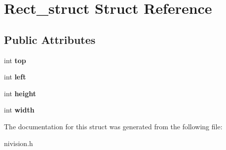 \hypertarget{structRect__struct}{
\section{Rect\_\-struct Struct Reference}
\label{structRect__struct}
}
\subsection*{Public Attributes}
\begin{DoxyCompactItemize}
\item 
\hypertarget{structRect__struct_a87ebf8a6280b23db750fd6d4e358d62b}{
int {\bfseries top}}
\label{structRect__struct_a87ebf8a6280b23db750fd6d4e358d62b}

\item 
\hypertarget{structRect__struct_a261b0001e6bd3dd2118e561e2dc1b838}{
int {\bfseries left}}
\label{structRect__struct_a261b0001e6bd3dd2118e561e2dc1b838}

\item 
\hypertarget{structRect__struct_a4033be30e4966e318c9bd115538c6163}{
int {\bfseries height}}
\label{structRect__struct_a4033be30e4966e318c9bd115538c6163}

\item 
\hypertarget{structRect__struct_ab21213efdd7b95b183b2859fe7dff978}{
int {\bfseries width}}
\label{structRect__struct_ab21213efdd7b95b183b2859fe7dff978}

\end{DoxyCompactItemize}


The documentation for this struct was generated from the following file:\begin{DoxyCompactItemize}
\item 
nivision.h\end{DoxyCompactItemize}
